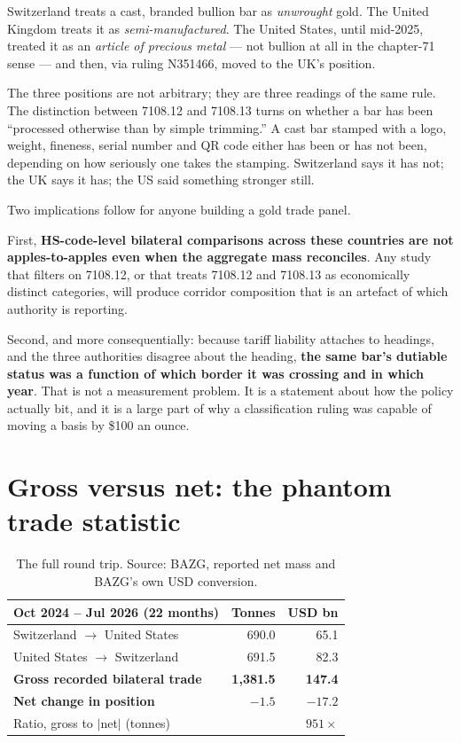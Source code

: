 \documentclass[11pt,a4paper]{article}
\begin{document}
Switzerland treats a cast, branded bullion bar as \emph{unwrought} gold. The United Kingdom
treats it as \emph{semi-manufactured}. The United States, until mid-2025, treated it as an
\emph{article of precious metal} --- not bullion at all in the chapter-71 sense --- and then, via
ruling N351466, moved to the UK's position.

The three positions are not arbitrary; they are three readings of the same rule. The
distinction between 7108.12 and 7108.13 turns on whether a bar has been ``processed otherwise
than by simple trimming.'' A cast bar stamped with a logo, weight, fineness, serial number and
QR code either has been or has not been, depending on how seriously one takes the stamping.
Switzerland says it has not; the UK says it has; the US said something stronger still.

Two implications follow for anyone building a gold trade panel.

First, \textbf{HS-code-level bilateral comparisons across these countries are not
apples-to-apples even when the aggregate mass reconciles}. Any study that filters on 7108.12,
or that treats 7108.12 and 7108.13 as economically distinct categories, will produce corridor
composition that is an artefact of which authority is reporting.

Second, and more consequentially: because tariff liability attaches to headings, and the three
authorities disagree about the heading, \textbf{the same bar's dutiable status was a function of
which border it was crossing and in which year}. That is not a measurement problem. It is a
statement about how the policy actually bit, and it is a large part of why a classification
ruling was capable of moving a basis by \$100 an ounce.

\section{Gross versus net: the phantom trade statistic}

\begin{table}[h]
\centering
\begin{tabular}{@{}lrr@{}}
\toprule
\textbf{Oct 2024 -- Jul 2026 (22 months)} & \textbf{Tonnes} & \textbf{USD bn} \\
\midrule
Switzerland $\to$ United States & 690.0 & 65.1 \\
United States $\to$ Switzerland & 691.5 & 82.3 \\
\midrule
\textbf{Gross recorded bilateral trade} & \textbf{1{,}381.5} & \textbf{147.4} \\
\textbf{Net change in position} & \textbf{$-1.5$} & \textbf{$-17.2$} \\
\midrule
Ratio, gross to $|$net$|$ (tonnes) & \multicolumn{2}{r}{$951\times$} \\
\bottomrule
\end{tabular}
\caption{The full round trip. Source: BAZG, reported net mass and BAZG's own USD conversion.}
\label{tab:grossnet}
\end{table}
\end{document}
